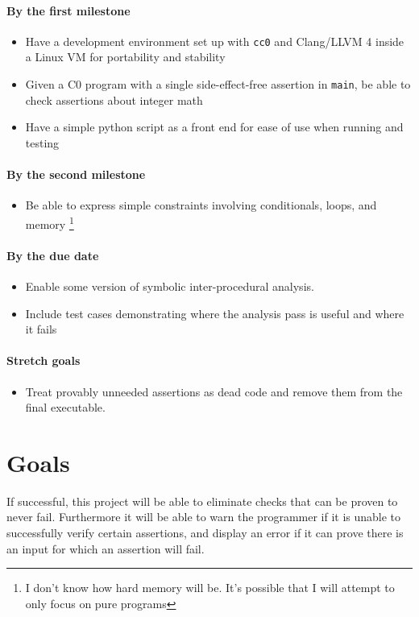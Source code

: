 \documentclass[]{article}
\begin{document}
\begin{multicols}{2}
\paragraph{By the first milestone}
\begin{itemize}
  \item Have a development environment set up with \texttt{cc0} and Clang/LLVM 4 inside a Linux VM for portability and stability
  \item Given a C0 program with a single side-effect-free assertion in \texttt{main}, be able to check assertions about integer math
  \item Have a simple python script as a front end for ease of use when running and testing
\end{itemize}

\paragraph{By the second milestone}
\begin{itemize}
  \item Be able to express simple constraints involving conditionals, loops, and memory
  \footnote{I don't know how hard memory will be. It's possible that I will attempt to only focus on pure programs}
\end{itemize}

\paragraph{By the due date}
\begin{itemize}
  \item Enable some version of symbolic inter-procedural analysis.
  \item Include test cases demonstrating where the analysis pass is useful and where it fails
\end{itemize}
\paragraph{Stretch goals}
\begin{itemize}
  \item Treat provably unneeded assertions as dead code and remove them from the final executable.
\end{itemize}

\section{Goals}
If successful, this project will be able to eliminate checks that can be proven to never fail.
Furthermore it will be able to warn the programmer if it is unable to successfully verify certain assertions, and display an error if it can prove there is an input for which an assertion will fail.
\end{multicols}
\end{document}
